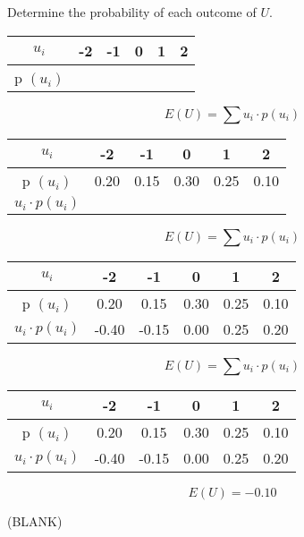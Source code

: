 \documentclass[a4paper,12pt]{article}
\begin{document}
	
\noindent Determine the probability of each outcome of $U$.
	\\
	\begin{center}
		\begin{tabular}{|c|c|c|c|c|c|}
			\hline $u_i$ & -2 & -1  & 0 & 1 & 2 \\ 
			\hline p $(u_i)$ & \phantom{spaces} & \phantom{spaces} & \phantom{spaces} & \phantom{spaces} & \phantom{spaces} \\ 
			\hline 
		\end{tabular} 
	\end{center}
	
	
	
	
	
	\[ E(U) =  \sum  u_i \cdot p(u_i)   \]
	\begin{center}
		\begin{tabular}{|c|c|c|c|c|c|}
			\hline $u_i$ & -2 & -1  & 0 & 1 & 2 \\ 
			\hline p $(u_i)$ & \phantom{s}0.20\phantom{s} & \phantom{s}0.15\phantom{s}  & \phantom{s}0.30\phantom{s}  & \phantom{s}0.25\phantom{s} & \phantom{s}0.10\phantom{s} \\ 
			\hline 
			$u_i \cdot p (u_i)$ & & & & & \\\hline
		\end{tabular} 
	\end{center}
	
	

	
	\[ E(U) =  \sum  u_i \cdot p(u_i)   \]
	\begin{center}
		\begin{tabular}{|c|c|c|c|c|c|}
			\hline $u_i$ & -2 & -1  & 0 & 1 & 2 \\ 
			\hline p $(u_i)$ & \phantom{s}0.20\phantom{s} & \phantom{s}0.15\phantom{s}  & \phantom{s}0.30\phantom{s}  & \phantom{s}0.25\phantom{s} & \phantom{s}0.10\phantom{s} \\ 
			\hline 
			$u_i \cdot p (u_i)$ & -0.40 & -0.15 & 0.00 & 0.25 & 0.20 \\\hline
		\end{tabular} 
		
		
	\end{center}
	
	\[ E(U) =  \sum  u_i \cdot p(u_i)   \]
	\begin{center}
		\begin{tabular}{|c|c|c|c|c|c|}
			\hline $u_i$ & -2 & -1  & 0 & 1 & 2 \\ 
			\hline p $(u_i)$ & \phantom{s}0.20\phantom{s} & \phantom{s}0.15\phantom{s}  & \phantom{s}0.30\phantom{s}  & \phantom{s}0.25\phantom{s} & \phantom{s}0.10\phantom{s} \\ 
			\hline 
			$u_i \cdot p (u_i)$ & -0.40 & -0.15 & 0.00 & 0.25 & 0.20 \\\hline
		\end{tabular} 
		
		
	\end{center}
	
	\[E(U) = -0.10\]
	

	


\newpage 
(BLANK)
	
	
\end{document}
